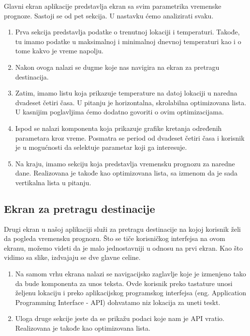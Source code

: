 \documentclass[12pt,oneside]{memoir}
\begin{document}
Glavni ekran aplikacije predstavlja ekran sa svim parametrika vremenske prognoze. Sastoji se od pet sekcija. U nastavku ćemo analizirati svaku.

\begin{enumerate}
    \item Prva sekcija predstavlja podatke o trenutnoj lokaciji i temperaturi. Takođe, tu imamo podatke u maksimalnoj i minimalnoj dnevnoj temperaturi kao i o tome kakvo je vreme napolju.
    \item Nakon ovoga nalazi se dugme koje nas navigira na ekran za pretragu destinacija.
    \item Zatim, imamo listu koja prikazuje temperature na datoj lokaciji u naredna dvadeset četiri časa. U pitanju je horizontalna, skrolabilna optimizovana lista. U kasnijim poglavljima ćemo dodatno govoriti o ovim optimizacijama.
    \item Ispod se nalazi komponenta koja prikazuje grafike kretanja određenih parametara kroz vreme. Posmatra se period od dvadeset četiri časa i korisnik je u mogućnosti da selektuje parametar koji ga interesuje.
    \item Na kraju, imamo sekciju koja predstavlja vremensku prognozu za naredne dane. Realizovana je takođe kao optimizovana lista, sa izmenom da je sada vertikalna lista u pitanju.
\end{enumerate}

\subsection{Ekran za pretragu destinacije}

Drugi ekran u našoj aplikaciji služi za pretragu destinacije na kojoj korisnik želi da pogleda vremensku prognozu. Što se tiče korisničkog interfejsa na ovom ekranu, možemo videti da je malo jednostavniji u odnosu na prvi ekran. Kao što vidimo sa slike, izdvajaju se dve glavne celine.

\begin{enumerate}
    \item Na samom vrhu ekrana nalazi se navigacijsko zaglavlje koje je izmenjeno tako da bude komponenta za unos teksta. Ovde korisnik preko tastature unosi željenu lokaciju i preko aplikacijskog programskog interfejsa (eng. Application Programming Interface - API) dohvatamo niz lokacija za uneti teskt.
    \item Uloga druge sekcije jeste da se prikažu podaci koje nam je API vratio. Realizovana je takođe kao optimizovana lista.
\end{enumerate}
\end{document}
